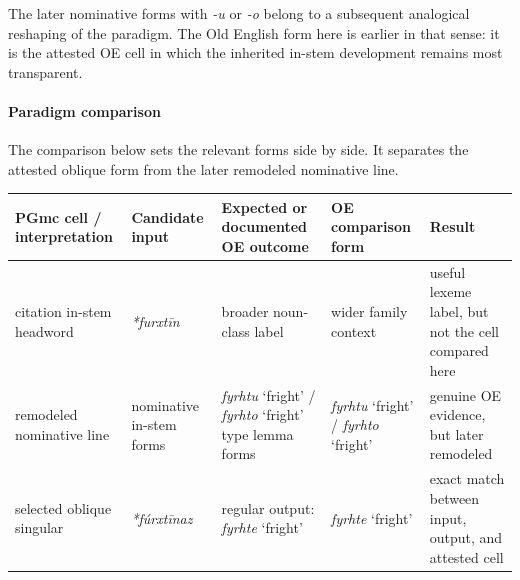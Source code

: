 \documentclass[
  british,
  a4paper,
]{article}
\newcounter{none} %
\begin{document}
The later nominative forms with \emph{-u} or \emph{-o} belong to a
subsequent analogical reshaping of the paradigm. The Old English form
here is earlier in that sense: it is the attested OE cell in which the
inherited in-stem development remains most transparent.

\paragraph{Paradigm comparison}\label{paradigm-comparison-5}

The comparison below sets the relevant forms side by side. It separates
the attested oblique form from the later remodeled nominative line.

{\def\LTcaptype{none} %
\begin{longtable}[]{@{}
  >{\raggedright\arraybackslash}p{}
  >{\raggedright\arraybackslash}p{}
  >{\raggedright\arraybackslash}p{}
  >{\raggedright\arraybackslash}p{}
  >{\raggedright\arraybackslash}p{}@{}}
\toprule\noalign{}
\begin{minipage}[b]{\linewidth}\raggedright
PGmc cell / interpretation
\end{minipage} & \begin{minipage}[b]{\linewidth}\raggedright
Candidate input
\end{minipage} & \begin{minipage}[b]{\linewidth}\raggedright
Expected or documented OE outcome
\end{minipage} & \begin{minipage}[b]{\linewidth}\raggedright
OE comparison form
\end{minipage} & \begin{minipage}[b]{\linewidth}\raggedright
Result
\end{minipage} \\
\midrule\noalign{}
\endhead
\bottomrule\noalign{}
\endlastfoot
citation in-stem headword & {\emph{*furxtīn}} & broader noun-class label
& wider family context & useful lexeme label, but not the cell compared
here \\
remodeled nominative line & nominative in-stem forms & {\emph{fyrhtu}}
`fright' / {\emph{fyrhto}} `fright' type lemma forms & {\emph{fyrhtu}}
`fright' / {\emph{fyrhto}} `fright' & genuine OE evidence, but later
remodeled \\
selected oblique singular & {\emph{*fúrxtīnaz}} & regular output:
{\emph{fyrhte}} `fright' & {\emph{fyrhte}} `fright' & exact match
between input, output, and attested cell \\
\end{longtable}
}
\end{document}
